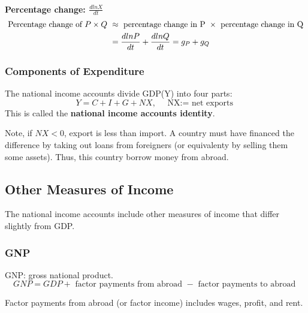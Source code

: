 \documentclass[12pt]{article}
\begin{document}
\noindent{}\\


{\textbf {Percentage change: $ \frac{dlnX}{dt} $}}\\
\begin{align*}
\text{ Percentage change of $ P  \times Q $ } &\approx
\text{ percentage change in P } \times \text{ percentage change in Q }\\
 &= \frac{dlnP}{dt} + \frac{dlnQ}{dt} = g_{P} + g_{Q}
\end{align*}

\subsubsection{Components of Expenditure}
The national income accounts divide GDP(Y) into four parts:
\begin{equation*}
Y = C + I + G + NX,\quad \text{ NX:= net exports }
\end{equation*}
This is called the {\textbf {national income accounts identity}}.

Note, if $ NX < 0 $, export is less than import. A country must have financed the
difference by taking out loans from foreigners (or equivalenty by selling them
some assets). Thus, this country borrow money from abroad.



\subsection{Other Measures of Income}


The national income accounts include other measures of income that differ slightly
from GDP.

\subsubsection{GNP}
GNP: gross national product.
\begin{equation*}
GNP = GDP + \text{ factor payments from abroad } - \text{ factor payments to abroad }
\end{equation*}

Factor payments from abroad (or factor income) includes wages, profit, and rent.
\end{document}
